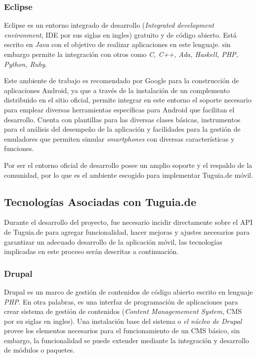 \subsubsection{Eclipse}

Eclipse es un entorno integrado de desarrollo (\textit{Integrated development environment}, IDE por sus siglas en ingles) gratuito y de código abierto. Está escrito en \textit{Java} con el objetivo de realizar aplicaciones en este lenguaje. sin embargo permite la integración con otros como \textit{C, C++, Ada, Haskell, PHP, Python, Ruby}.

Este ambiente de trabajo es recomendado por Google para la construcción de aplicaciones Android, ya que a través de la instalación de un complemento distribuido en el sitio oficial, permite integrar en este entorno el soporte necesario para emplear diversas herramientas específicas para Android que facilitan el desarrollo. Cuenta con plantillas para las diversas clases básicas, instrumentos para el análisis del desempeño de la aplicación y facilidades para la gestión de emuladores que permiten simular \textit{smartphones} con diversas características y funciones.

Por ser el entorno oficial de desarrollo posee un amplio soporte y el respaldo de la comunidad, por lo que es el ambiente escogido para implementar Tuguia.de móvil.

\subsection{Tecnologías Asociadas con Tuguia.de} \label{subsect:Asociadas_tgd}

Durante el desarrollo del proyecto, fue necesario incidir directamente sobre el API de Tuguia.de para agregar funcionalidad, hacer mejoras y ajustes necesarios para garantizar un adecuado desarrollo de la aplicación móvil, las tecnologías implicadas en este proceso serán descritas a continuación.

\subsubsection{Drupal}

Drupal es un marco de gestión de contenidos de código abierto escrito en lenguaje \textit{PHP}. En otra palabras, es una interfaz de programación de aplicaciones para crear sistema de gestión de contenidos (\textit{Content Managemement System}, CMS por su siglas en ingles). Una instalación base del sistema o \textit{el núcleo de Drupal} provee los elementos necesarios para el funcionamiento de un CMS básico, sin embargo, la funcionalidad se puede extender mediante la integración y desarrollo de módulos o paquetes\cite{TV10}.

